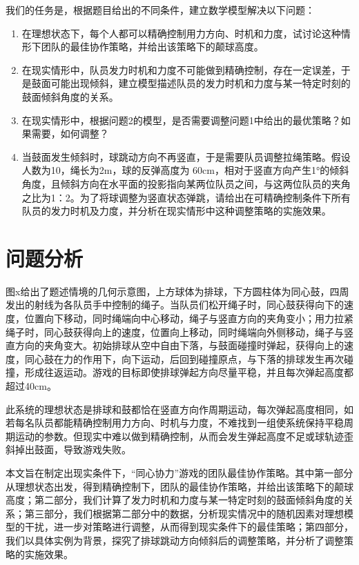 \documentclass[withoutpreface,bwprint]{cumcmthesis} %
\begin{document}
我们的任务是，根据题目给出的不同条件，建立数学模型解决以下问题：
\begin{enumerate}
\item 在理想状态下，每个人都可以精确控制用力方向、时机和力度，试讨论这种情形下团队的最佳协作策略，并给出该策略下的颠球高度。
\item 在现实情形中，队员发力时机和力度不可能做到精确控制，存在一定误差，于是鼓面可能出现倾斜，建立模型描述队员的发力时机和力度与某一特定时刻的鼓面倾斜角度的关系。
\item 在现实情形中，根据问题2的模型，是否需要调整问题1中给出的最优策略？如果需要，如何调整？
\item 当鼓面发生倾斜时，球跳动方向不再竖直，于是需要队员调整拉绳策略。假设人数为10，绳长为2m，球的反弹高度为 60cm，相对于竖直方向产生1°的倾斜角度，且倾斜方向在水平面的投影指向某两位队员之间，与这两位队员的夹角之比为1：2。为了将球调整为竖直状态弹跳，请给出在可精确控制条件下所有队员的发力时机及力度，并分析在现实情形中这种调整策略的实施效果。
\end{enumerate}

\section{问题分析}
图x给出了题述情境的几何示意图，上方球体为排球，下方圆柱体为同心鼓，四周发出的射线为各队员手中控制的绳子。当队员们松开绳子时，同心鼓获得向下的速度，位置向下移动，同时绳端向中心移动，绳子与竖直方向的夹角变小；用力拉紧绳子时，同心鼓获得向上的速度，位置向上移动，同时绳端向外侧移动，绳子与竖直方向的夹角变大。初始排球从空中自由下落，与鼓面碰撞时弹起，获得向上的速度，同心鼓在力的作用下，向下运动，后回到碰撞原点，与下落的排球发生再次碰撞，形成往返运动。游戏的目标即使排球弹起方向尽量平稳，并且每次弹起高度都超过40cm。

此系统的理想状态是排球和鼓都恰在竖直方向作周期运动，每次弹起高度相同，如若每名队员都能精确控制用力方向、时机与力度，不难找到一组使系统保持平稳周期运动的参数。但现实中难以做到精确控制，从而会发生弹起高度不足或球轨迹歪斜掉出鼓面，导致游戏失败。

本文旨在制定出现实条件下，“同心协力”游戏的团队最佳协作策略。其中第一部分从理想状态出发，得到精确控制下，团队的最佳协作策略，并给出该策略下的颠球高度；第二部分，我们计算了发力时机和力度与某一特定时刻的鼓面倾斜角度的关系；第三部分，我们根据第二部分中的数据，分析现实情况中的随机因素对理想模型的干扰，进一步对策略进行调整，从而得到现实条件下的最佳策略；第四部分，我们以具体实例为背景，探究了排球跳动方向倾斜后的调整策略，并分析了调整策略的实施效果。
\end{document}
